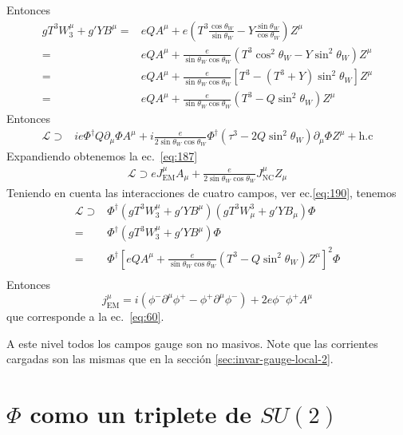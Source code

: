 Entonces
\begin{align}
  \label{eq:189}
gT^3W^\mu_3+g'YB^\mu=& eQA^\mu+e\left(T^3\frac{\cos\theta_W}{\sin\theta_W}-Y\frac{\sin\theta_W}{\cos\theta_W}\right) Z^\mu\nonumber\\
=&eQ A^\mu+\frac{e}{\sin\theta_W \cos\theta_W}\left(T^3\cos^2\theta_W-Y\sin^2\theta_W\right) Z^\mu\nonumber\\
=&eQ A^\mu+\frac{e}{\sin\theta_W \cos\theta_W}\left[T^3-\left(T^3+Y\right)\sin^2\theta_W\right] Z^\mu\nonumber\\
=&eQA^\mu+\frac{e}{\sin\theta_W \cos\theta_W}\left(T^3-Q\sin^2\theta_W\right)Z^\mu
\end{align}
Entonces
\begin{align}
\label{eq:227}
\mathcal{L}\supset&ie\Phi^\dagger Q\partial_\mu\Phi A^\mu+i\frac{e}{2\sin\theta_W \cos\theta_W}\Phi^\dagger\left(\tau^3-2Q\sin^2\theta_W\right)\partial_\mu\Phi Z^\mu+\text{h.c}
\end{align}
Expandiendo obtenemos la ec.~\eqref{eq:187}
\begin{align}
\mathcal{L}\supset eJ^\mu_{\text{EM}}A_\mu+\frac{e}{2\sin\theta_W \cos\theta_W}J^\mu_{\text{NC}}Z_\mu 
\end{align}
Teniendo en cuenta las interacciones de cuatro campos, ver ec.\eqref{eq:190}, tenemos
\begin{align}
  \mathcal{L}\supset&\Phi^\dagger (gT^3W^\mu_3+g'YB^\mu)(gT^3W_\mu^3+g'YB_\mu)\Phi\nonumber\\
  =&\Phi^\dagger (gT^3W^\mu_3+g'YB^\mu)\Phi\nonumber\\
  =& \Phi^\dagger \left[eQA^\mu
+\frac{e}{\sin\theta_W \cos\theta_W}\left(T^3-Q\sin^2\theta_W\right)Z^\mu\right]^2 \Phi\nonumber\\
\end{align}
Entonces 
\begin{equation}
   j^\mu_{\text{EM}}= i(\phi^-\partial^\mu\phi^+-\phi^+\partial^\mu\phi^-)+2e\phi^-\phi^+A^\mu  
\end{equation}
que corresponde a la ec.~\eqref{eq:60}.

A este nivel todos los campos gauge son no masivos. Note que las corrientes cargadas son las mismas que en la secci\'on \ref{sec:invar-gauge-local-2}.


\noindent{} %

\section{$\Phi$ como un triplete de $SU(2)$}
\label{sec:phi-como-un}

